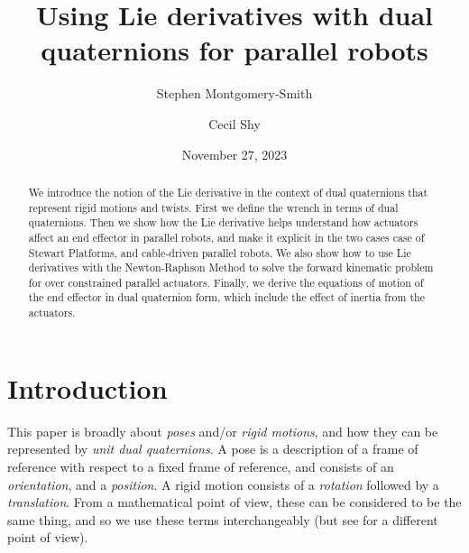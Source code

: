 \documentclass[reqno,12pt]{amsart}
\begin{document}
\title[Lie derivatives with dual quaternions]{Using Lie derivatives with dual quaternions for parallel robots}

\author{Stephen Montgomery-Smith}
\address{Department of Mathematics, University of Missouri, Columbia, MO 65211.\\
\rm\url{stephen@missouri.edu}\\
\rm\url{https://stephenmontgomerysmith.github.io}}

\author{Cecil Shy}
\address{Johnson Space Center, 2101 E.~NASA Parkway, Houston, TX 77058.\\
\rm\url{cecil.shy-1@nasa.gov}}


\date{November 27, 2023}

\begin{abstract}
We introduce the notion of the Lie derivative in the context of dual quaternions that represent rigid motions and twists.  First we define the wrench in terms of dual quaternions.  Then we show how the Lie derivative helps understand how actuators affect an end effector in parallel robots, and make it explicit in the two cases case of Stewart Platforms, and cable-driven parallel robots.  We also show how to use Lie derivatives with the Newton-Raphson Method to solve the forward kinematic problem for over constrained parallel actuators.  Finally, we derive the equations of motion of the end effector in dual quaternion form, which include the effect of inertia from the actuators.
\end{abstract}

\maketitle



\section{Introduction}

This paper is broadly about \emph{poses} and/or \emph{rigid motions}, and how they can be represented by \emph{unit dual quaternions}.  A pose is a description of a frame of reference with respect to a fixed frame of reference, and consists of an \emph{orientation}, and a \emph{position}.  A rigid motion consists of a \emph{rotation} followed by a \emph{translation}.  From a mathematical point of view, these can be considered to be the same thing, and so we use these terms interchangeably (but see \cite{chirikjian-et-al} for a different point of view).
\end{document}
